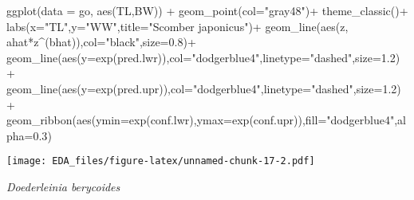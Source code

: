 \documentclass[
]{article}
\newenvironment{Shaded}{\begin{snugshade}}{\end{snugshade}}
\newcommand{\AttributeTok}[1]{\textcolor[rgb]{0.77,0.63,0.00}{#1}}
\newcommand{\FloatTok}[1]{\textcolor[rgb]{0.00,0.00,0.81}{#1}}
\newcommand{\FunctionTok}[1]{\textcolor[rgb]{0.00,0.00,0.00}{#1}}
\newcommand{\NormalTok}[1]{#1}
\newcommand{\SpecialCharTok}[1]{\textcolor[rgb]{0.00,0.00,0.00}{#1}}
\newcommand{\StringTok}[1]{\textcolor[rgb]{0.31,0.60,0.02}{#1}}
\begin{document}
\begin{Shaded}
\begin{Highlighting}[]
\FunctionTok{ggplot}\NormalTok{(}\AttributeTok{data =}\NormalTok{ go, }\FunctionTok{aes}\NormalTok{(TL,BW)) }\SpecialCharTok{+} \FunctionTok{geom\_point}\NormalTok{(}\AttributeTok{col=}\StringTok{"gray48"}\NormalTok{)}\SpecialCharTok{+} 
  \FunctionTok{theme\_classic}\NormalTok{()}\SpecialCharTok{+} \FunctionTok{labs}\NormalTok{(}\AttributeTok{x=}\StringTok{"TL"}\NormalTok{,}\AttributeTok{y=}\StringTok{"WW"}\NormalTok{,}\AttributeTok{title=}\StringTok{"Scomber japonicus"}\NormalTok{)}\SpecialCharTok{+}
  \FunctionTok{geom\_line}\NormalTok{(}\FunctionTok{aes}\NormalTok{(z, ahat}\SpecialCharTok{*}\NormalTok{z}\SpecialCharTok{\^{}}\NormalTok{(bhat)),}\AttributeTok{col=}\StringTok{"black"}\NormalTok{,}\AttributeTok{size=}\FloatTok{0.8}\NormalTok{)}\SpecialCharTok{+}
  \FunctionTok{geom\_line}\NormalTok{(}\FunctionTok{aes}\NormalTok{(}\AttributeTok{y=}\FunctionTok{exp}\NormalTok{(pred.lwr)),}\AttributeTok{col=}\StringTok{"dodgerblue4"}\NormalTok{,}\AttributeTok{linetype=}\StringTok{"dashed"}\NormalTok{,}\AttributeTok{size=}\FloatTok{1.2}\NormalTok{)}\SpecialCharTok{+} 
  \FunctionTok{geom\_line}\NormalTok{(}\FunctionTok{aes}\NormalTok{(}\AttributeTok{y=}\FunctionTok{exp}\NormalTok{(pred.upr)),}\AttributeTok{col=}\StringTok{"dodgerblue4"}\NormalTok{,}\AttributeTok{linetype=}\StringTok{"dashed"}\NormalTok{,}\AttributeTok{size=}\FloatTok{1.2}\NormalTok{)}\SpecialCharTok{+}
  \FunctionTok{geom\_ribbon}\NormalTok{(}\FunctionTok{aes}\NormalTok{(}\AttributeTok{ymin=}\FunctionTok{exp}\NormalTok{(conf.lwr),}\AttributeTok{ymax=}\FunctionTok{exp}\NormalTok{(conf.upr)),}\AttributeTok{fill=}\StringTok{"dodgerblue4"}\NormalTok{,}\AttributeTok{alpha=}\FloatTok{0.3}\NormalTok{)}
\end{Highlighting}
\end{Shaded}

\texttt{[image: EDA\_files/figure-latex/unnamed-chunk-17-2.pdf]}

\emph{Doederleinia berycoides}
\end{document}
